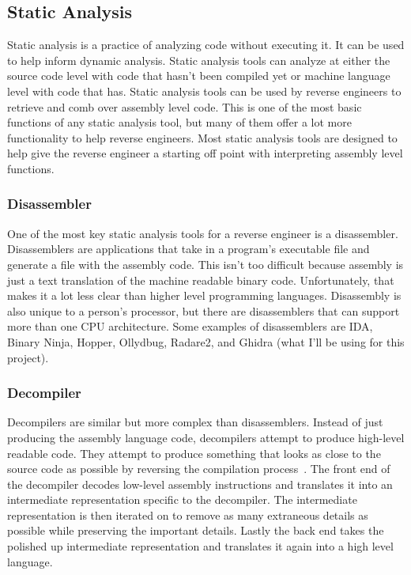 \documentclass[12pt]{article}
\begin{document}
\subsection{Static Analysis}

Static analysis is a practice of analyzing code without executing it. It can  be used to help inform dynamic analysis. Static analysis tools can analyze at either the source code level with code that hasn’t been compiled yet or machine language level with code that has. Static analysis tools can be used by reverse engineers to retrieve and comb over assembly level code. This is one of the most basic functions of any static analysis tool, but many of them offer a lot more functionality to help reverse engineers. Most static analysis tools are designed to help give the reverse engineer a starting off point with interpreting assembly level functions.

\subsubsection{Disassembler}
One of the most key static analysis tools for a reverse engineer is a disassembler. Disassemblers are applications that take in a program’s executable file and generate a file with the assembly code. This isn’t too difficult because assembly is just a text translation of the machine readable binary code. Unfortunately, that makes it a lot less clear than higher level programming languages.  Disassembly is also unique to a person’s processor, but there are disassemblers that can support more than one CPU architecture. Some examples of disassemblers are IDA, Binary Ninja, Hopper, Ollydbug, Radare2, and Ghidra (what I’ll be using for this project). 

\subsubsection{Decompiler}
Decompilers are similar but more complex than disassemblers. Instead of just producing the assembly language code, decompilers attempt to produce high-level readable code. They attempt to produce something that looks as close to the source code as possible by reversing the compilation process~\cite{Reversing}. The front end of the decompiler decodes low-level assembly instructions and translates it into an intermediate representation specific to the decompiler. The intermediate representation is then iterated on to remove as many extraneous details as possible while preserving the important details. Lastly the back end takes the polished up intermediate representation and translates it again into a high level language.
\end{document}
